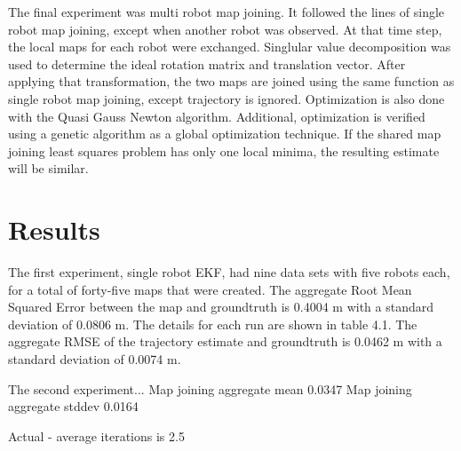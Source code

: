 \documentclass[12pt]{report}
\begin{document}
The final experiment was multi robot map joining.  It followed the lines of single robot map joining, except when another robot was observed.  At that time step, the local maps for each robot were exchanged.  Singlular value decomposition was used to determine the ideal rotation matrix and translation vector.  After applying that transformation, the two maps are joined using the same function as single robot map joining, except trajectory is ignored.  Optimization is also done with the Quasi Gauss Newton algorithm.  Additional, optimization is verified using a genetic algorithm as a global optimization technique.  If the shared map joining least squares problem has only one local minima, the resulting estimate will be similar.  

\chapter{Results}

The first experiment, single robot EKF, had nine data sets with five robots each, for a total of forty-five maps that were created.  The aggregate Root Mean Squared Error between the map and groundtruth is 0.4004 m with a standard deviation of 0.0806 m.  The details for each run are shown in table 4.1.  The aggregate RMSE of the trajectory estimate and groundtruth is 0.0462 m with a standard deviation of 0.0074 m.  

The second experiment...
Map joining aggregate mean 0.0347
Map joining aggregate stddev 0.0164

Actual - average iterations is 2.5
\end{document}
